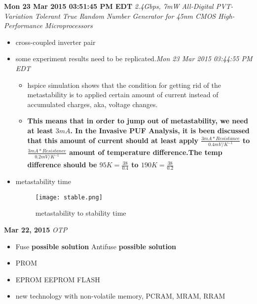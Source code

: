 \documentclass[]{article}
\newcommand{\todo}[1]{{\color{red}\textbf{#1}}}
\newcommand{\solved}[1]{{\color{blue}\textit{#1}}}
\begin{document}
\noindent \textbf{Mon 23 Mar 2015 03:51:45 PM EDT}
\textit{2.4Gbps, 7mW All-Digital PVT-Variation Tolerant True Random Number
Generator for 45nm CMOS High-Performance Microprocessors}
\indent     \begin{itemize}
            \item cross-coupled inverter pair
            \item some experiment results need to be replicated.\solved{Mon 23
            Mar 2015 03:44:55 PM EDT}
                \begin{itemize}
                    \item hspice simulation shows that the condition for getting
                    rid of the metastability is to applied certain amount of
                    current instead of accumulated charges, aka, voltage
                    changes.
                    \item \todo{This means that in order to jump out of
                    metastability, we need at least $3mA$. In the Invasive PUF
                    Analysis, it is been discussed that this amount of current
                    should at least apply 
                    $\frac{3mA * Resistance}{0.4mV/K^{-1}}$ to
                    $\frac{3mA * Resistance}{0.2mV/K^{-1}}$ 
                    amount of temperature difference.The temp difference should
                    be $95K=\frac{38}{0.4}$ to $190K=\frac{38}{0.2}$}
                \end{itemize}
            \item metastability time
            \begin{figure}
                \begin{center}
                    \texttt{[image: stable.png]}
                    \caption{metastability to stability time}
                \end{center}
            \end{figure}

            \end{itemize}

\noindent \textbf{Mar 22, 2015}
\textit{OTP}
\indent     \begin{itemize}
            \item Fuse \textbf{possible solution} Antifuse \textbf{possible
            solution}
            \item PROM
            \item EPROM EEPROM FLASH
            \item new technology with non-volatile memory, PCRAM, MRAM, RRAM 
            \end{itemize}
\end{document}

